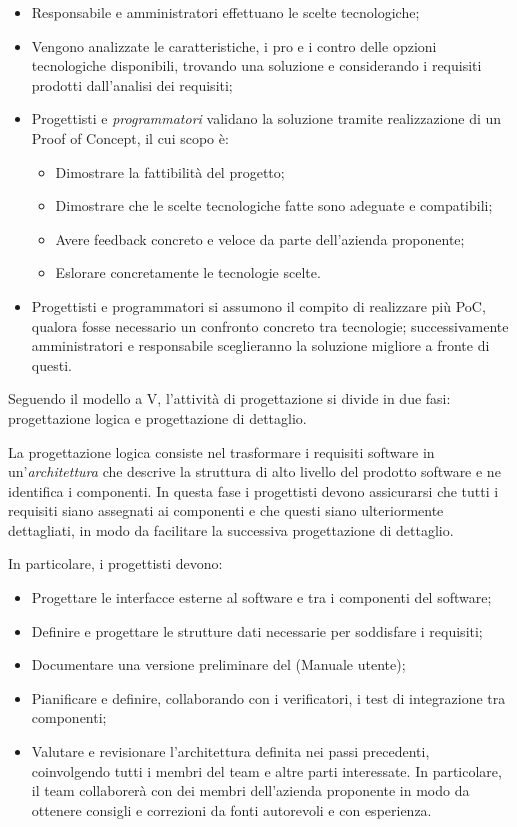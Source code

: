 \documentclass[10pt, a4paper]{article}
\begin{document}
\begin{itemize}
    \item Responsabile e amministratori effettuano le scelte tecnologiche;
    \item Vengono analizzate le caratteristiche, i pro e i contro delle opzioni tecnologiche disponibili, trovando una soluzione e considerando i requisiti prodotti dall'analisi dei requisiti;
    \item Progettisti e \textit{programmatori\pg} validano la soluzione tramite realizzazione di un Proof of Concept, il cui scopo è:
    \begin{itemize}
        \item Dimostrare la fattibilità del progetto;
        \item Dimostrare che le scelte tecnologiche fatte sono adeguate e compatibili;
        \item Avere feedback concreto e veloce da parte dell'azienda proponente;
        \item Eslorare concretamente le tecnologie scelte.
    \end{itemize}
    \item Progettisti e programmatori si assumono il compito di realizzare più PoC, qualora fosse necessario un confronto concreto tra tecnologie; successivamente amministratori e responsabile sceglieranno la soluzione migliore a fronte di questi.
\end{itemize}




Seguendo il modello a V, l'attività di progettazione si divide in due fasi: progettazione logica e progettazione di dettaglio.

La progettazione logica consiste nel trasformare i requisiti software in un'\textit{architettura\pg} che descrive la struttura di alto livello del prodotto software e ne identifica i componenti.
In questa fase i progettisti devono assicurarsi che tutti i requisiti siano assegnati ai componenti e che questi siano ulteriormente dettagliati, in modo da facilitare la successiva progettazione di dettaglio.

In particolare, i progettisti devono:
\begin{itemize}
    \item Progettare le interfacce esterne al software e tra i componenti del software;
    \item Definire e progettare le strutture dati necessarie per soddisfare i requisiti;
    \item Documentare una versione preliminare del (Manuale utente);
    \item Pianificare e definire, collaborando con i verificatori, i test di integrazione tra componenti;
    \item Valutare e revisionare l'architettura definita nei passi precedenti, coinvolgendo tutti i membri del team e altre parti interessate. In particolare, il team collaborerà con dei membri dell'azienda proponente in modo da ottenere consigli e correzioni da fonti autorevoli e con esperienza.
\end{itemize}
\end{document}
